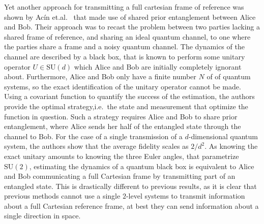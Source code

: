 \documentclass{article}
\begin{document}
Yet another approach for transmitting a full cartesian frame of reference was shown by Ac\'{i}n et.al.~\cite{AJV01} that made use of shared prior entanglement between Alice and Bob.  Their approach was to recast the problem between two parties lacking a shared frame of reference, and sharing an ideal quantum channel, to one where the parties share a frame and a noisy quantum channel.  The dynamics of the channel are described by a black box, that is known to perform some unitary operator $U\in \mathrm{SU}(d)$ which Alice and Bob are initially completely ignorant about.  Furthermore, Alice and Bob only have a finite number $N$ of of quantum systems, so the exact identification of the unitary operator cannot be made.  Using a covariant function to quantify the success of the estimation, the authors provide the optimal strategy,i.e.~the state and measurement that optimize the function in question.  Such a strategy requires Alice and Bob to share prior entanglement, where Alice sends her half of the entangled state through the channel to Bob.  For the case of a single transmission of a $d$-dimensional quantum system, the authors show that the average fidelity scales as $2/d^2$.  As knowing the exact unitary amounts to knowing the three Euler angles, that parametrize $\mathrm{SU}(2)$, estimating the dynamics of a quantum black box is equivalent to Alice and Bob communicating a full Cartesian frame by transmitting part of an entangled state.  This is drastically different to previous results, as it is clear that previous methods cannot use a single $2$-level systems to transmit information about a full Cartesian reference frame, at best they can send information about a single direction in space.   
\end{document}
